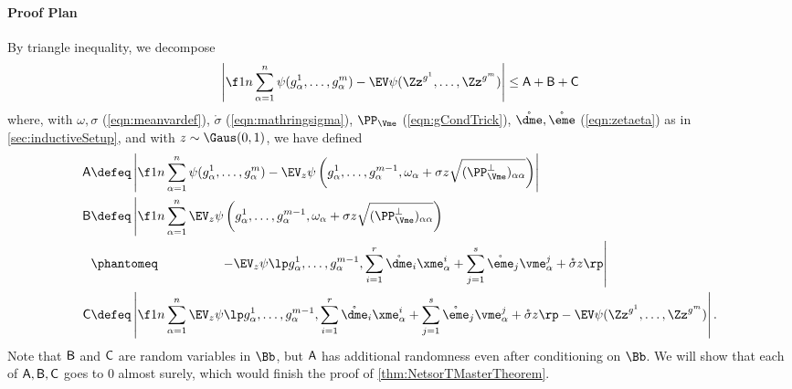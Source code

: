 \documentclass[main.tex]{subfiles}
\begin{document}
\paragraph{Proof Plan}
By triangle inequality, we decompose
\begin{align}
        \left|\f 1 n \sum_{\alpha = 1}^n \psi(g^1_\alpha, \ldots, g^{\MM}_\alpha)
        - \EV \psi(\Zz^{g^1}, \ldots, \Zz^{g^\MM})
        \right|
    \le
        \probA + \probB + \probC
        \label{eqn:decompABC}
\end{align}
where, with $\omega, \sigma$ (\cref{eqn:meanvardef}), $\mathring \sigma$ (\cref{eqn:mathringsigma}), $\PP_{\Vme}$ (\cref{eqn:gCondTrick}), $\mathring \dme, \mathring\eme$ (\cref{eqn:zetaeta}) as in \cref{sec:inductiveSetup}, and with $z  \sim \Gaus(0, 1)$, we have defined
\begin{align*}
    \probA
        &\defeq
            \left|\f 1 n \sum_{\alpha = 1}^n \psi(g^1_\alpha, \ldots, g^{\MM}_\alpha)
            - \EV_z\psi\left(g^1_\alpha, \ldots, g^{\MM-1}_\alpha, \omega_\alpha + \sigma z \sqrt{(\PP^\perp_{\Vme})_{\alpha\alpha}}\right)\right|
            \\
    \probB
        &\defeq
            \left|
            \f 1 n \sum_{\alpha = 1}^n \EV_z\psi\left(g^1_\alpha, \ldots, g^{\MM-1}_\alpha, \omega_\alpha + \sigma z \sqrt{(\PP^\perp_{\Vme})_{\alpha\alpha}}\right)
            \right.
            \\
          &\phantomeq
            \phantom{\f 1 n \sum_{\alpha = 1}^n}\quad
            \left.
            -
            \EV_z
                {
                    \psi\lp
                        g^1_\alpha, \ldots, g^{\MM-1}_\alpha,
                        \sum_{i=1}^r \mathring {\dme}_i \xme^i_\alpha +
                        \sum_{j=1}^s \mathring {\eme}_j \vme^j_\alpha + \mathring \sigma z
                        \rp
                }
            \right|
            \\
    \probC
        &\defeq
            \left|
            \f 1 n \sum_{\alpha = 1}^n
            \EV_z
                {
                    \psi\lp
                        g^1_\alpha, \ldots, g^{\MM-1}_\alpha,
                        \sum_{i=1}^r \mathring {\dme}_i \xme^i_\alpha +
                        \sum_{j=1}^s \mathring {\eme}_j \vme^j_\alpha + \mathring \sigma z
                        \rp
                }
            -
            \EV \psi(\Zz^{g^1}, \ldots, \Zz^{g^\MM})
            \right|
            .
\end{align*}
Note that $\mathsf{B}$ and $\mathsf{C}$ are random variables in $\Bb$, but $\mathsf{A}$ has additional randomness even after conditioning on $\Bb$.
We will show that each of $\mathsf{A}, \mathsf{B}, \mathsf{C}$ goes to 0 almost surely, which would finish the proof of \cref{thm:NetsorTMasterTheorem}.
\end{document}
